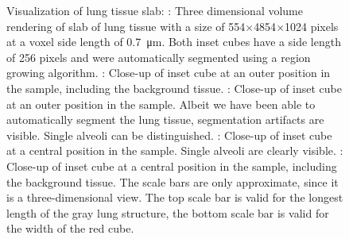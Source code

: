 \begin{figure}
{%
	 	\label{subfig:LungSlabDetailsRedBG}%
		}
	\caption{Visualization of lung tissue slab: %
		: Three dimensional volume rendering of slab of lung tissue with a size of 554$\times$4854$\times$1024 pixels at a voxel side length of \SI{0.7}{\micro\meter}. Both inset cubes have a side length of 256 pixels and were automatically segmented using a region growing algorithm. 
 		: Close-up of inset cube at an outer position in the sample, including the background tissue. %
 		: Close-up of inset cube at an outer position in the sample. Albeit we have been able to automatically segment the lung tissue, segmentation artifacts are visible. Single alveoli can be distinguished. %
 		: Close-up of inset cube at a central position in the sample. Single alveoli are clearly visible. %
 		: Close-up of inset cube at a central position in the sample, including the background tissue. %
		The scale bars are only approximate, since it is a three-dimensional view. The top scale bar is valid for the longest length of the gray lung structure, the bottom scale bar is valid for the width of the red cube.%
	}
	\label{fig:LungSlabSophie}
\end{figure}